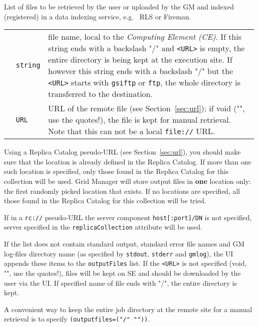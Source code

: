   List of files to be retrieved by the user or uploaded by the GM and
  indexed (registered) in a data indexing service, e.g. \globus\  RLS or Fireman.

  \begin{tabular}{llp{10cm}}
    \hspace*{1cm}&\texttt{string}& file name, local to the
    \textit{Computing Element (CE)}\index{Computing Element}. If this
    string ends with a backslash "/" and \verb#<URL># is empty, the
    entire directory is being kept at the execution site. If however
    this string ends with a backslash "/" but the \verb#<URL>#
    starts with \texttt{gsiftp} or \texttt{ftp}, the whole directory
    is transferred to the destination.\\
    \hspace*{1cm}&\texttt{URL} & URL of the remote file (see
    Section~\ref{sec:url}); if void ("", use the quotes!), the file is
    kept for manual retrieval.  Note that this can not be a local
    \texttt{file://} URL.\\
  \end{tabular}

  Using a Replica Catalog pseudo-URL (see Section~\ref{sec:url}), you should make
  sure that the location is already defined in the Replica Catalog. If more
  than one such location is specified, only those found in the Replica Catalog
  for this collection will be used. Grid Manager will store output files in
  \textbf{one} location only: the first randomly picked location that
  exists. If no locations are specified, all those found in the
  Replica Catalog for this collection will be tried.

  If in a \verb#rc://# pseudo-URL the server component \texttt{host[:port]/DN} is not
  specified, server specified in the \texttt{replicaCollection} attribute will be used.

  If the list does not contain standard output, standard error
  file names and GM log-files directory name (as specified by \texttt{stdout},
  \texttt{stderr} and \texttt{gmlog}), the UI appends these
  items to the \texttt{outputFiles} list. If the \verb#<URL># is not specified (void,
  "", use the quotes!), files will be kept on SE and should be downloaded 
  by the user via the UI. If specified name of file ends with "/", the 
  entire directory is kept.

  A convenient way to keep the entire job directory at the remote site
  for a manual retrieval is to specify \texttt{(outputfiles=("/" ""))}.

